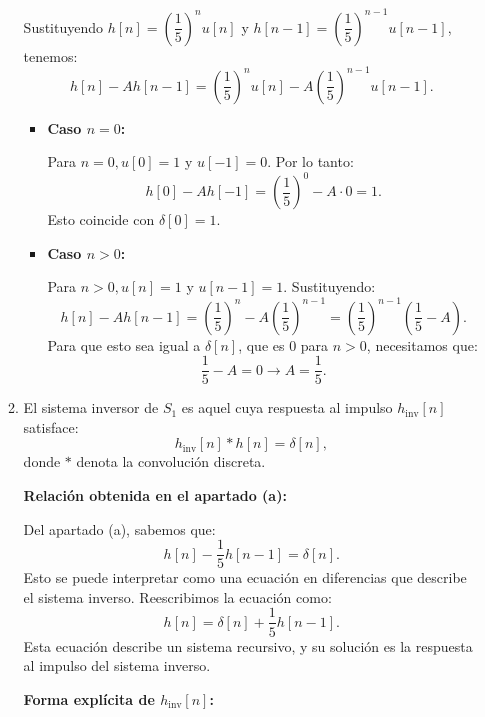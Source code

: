 \begin{enumerate}[label=\color{red}\textbf{\arabic*)}]
\begin{enumerate}[label=\color{red}\textbf{\alph*)}]
            Sustituyendo $h[n]=\left( \dfrac{1}{5} \right) ^nu[n]$ y $h[n-1]=\left( \dfrac{1}{5} \right) ^{n-1}u[n-1]$, tenemos: \[
                h[n]-Ah[n-1]=\left( \dfrac{1}{5} \right) ^nu[n]-A\left( \dfrac{1}{5} \right) ^{n-1}u[n-1].
            \] 
            \begin{itemize}[label=\textbullet]
                \item \textbf{Caso $n=0$:}

                    Para $n=0,u[0]=1$ y  $u[-1]=0$. Por lo tanto:  \[
                        h[0]-Ah[-1]=\left( \dfrac{1}{5} \right) ^0 -A\cdot 0=1.
                    \] 
                    Esto coincide con $\delta[0]=1$.
                \item  \textbf{Caso $n>0$:}

                    Para $n>0,u[n]=1$ y $u[n-1]=1$. Sustituyendo:  \[
                        h[n]-Ah[n-1]=\left( \dfrac{1}{5} \right) ^n-A\left( \dfrac{1}{5} \right) ^{n-1}=\left( \dfrac{1}{5} \right) ^{n-1}\left( \dfrac{1}{5}-A \right) .
                    \] 
                    Para que esto sea igual a $\delta[n]$, que es 0 para  $n>0$, necesitamos que:  \[
                    \dfrac{1}{5}-A=0\longrightarrow A=\dfrac{1}{5}.
                    \] 

            \end{itemize}
        \item {} 

            El sistema inversor de $S_1$ es aquel cuya respuesta al impulso $h_{\text{inv}}[n]$ satisface: \[
                h_{\text{inv}}[n]\ast h[n]=\delta[n],
            \] donde $\ast$ denota la convolución discreta.

             \textbf{Relación obtenida en el apartado (a):}

             Del apartado (a), sabemos que: \[
                 h[n]-\dfrac{1}{5}h[n-1]=\delta[n].
             \] 
             Esto se puede interpretar como una ecuación en diferencias que describe el sistema inverso. Reescribimos la ecuación como: \[
                 h[n]=\delta[n]+\dfrac{1}{5}h[n-1].
             \] 
             Esta ecuación describe un sistema recursivo, y su solución es la respuesta al impulso del sistema inverso.

             \textbf{Forma explícita de $h_{\text{inv}}[n]$:} 


\end{enumerate}
\end{enumerate}
